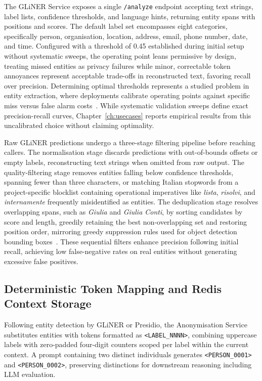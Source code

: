 The GLiNER Service exposes a single \texttt{/analyze} endpoint accepting text strings, label lists, confidence thresholds, and language hints, returning entity spans with positions and scores. The default label set encompasses eight categories, specifically person, organisation, location, address, email, phone number, date, and time. Configured with a threshold of 0.45 established during initial setup without systematic sweeps, the operating point leans permissive by design, treating missed entities as privacy failures while minor, correctable token annoyances represent acceptable trade-offs in reconstructed text, favoring recall over precision. Determining optimal thresholds represents a studied problem in entity extraction, where deployments calibrate operating points against specific miss versus false alarm costs~\cite{minkov2006tradeoff}. While systematic validation sweeps define exact precision-recall curves, Chapter~\ref{ch:usecases} reports empirical results from this uncalibrated choice without claiming optimality.

Raw GLiNER predictions undergo a three-stage filtering pipeline before reaching callers. The normalisation stage discards predictions with out-of-bounds offsets or empty labels, reconstructing text strings when omitted from raw output. The quality-filtering stage removes entities falling below confidence thresholds, spanning fewer than three characters, or matching Italian stopwords from a project-specific blocklist containing operational imperatives like \emph{lista}, \emph{risolvi}, and \emph{internamente} frequently misidentified as entities. The deduplication stage resolves overlapping spans, such as \emph{Giulia} and \emph{Giulia Conti}, by sorting candidates by score and length, greedily retaining the best non-overlapping set and restoring position order, mirroring greedy suppression rules used for object detection bounding boxes~\cite{neubeck2006nms}. These sequential filters enhance precision following initial recall, achieving low false-negative rates on real entities without generating excessive false positives.

\subsection{Deterministic Token Mapping and Redis Context Storage}
\label{subsec:impl_token_reinjection}

Following entity detection by GLiNER or Presidio, the Anonymisation Service substitutes entities with tokens formatted as \texttt{<LABEL\_NNNN>}, combining uppercase labels with zero-padded four-digit counters scoped per label within the current context. A prompt containing two distinct individuals generates \texttt{<PERSON\_0001>} and \texttt{<PERSON\_0002>}, preserving distinctions for downstream reasoning including LLM evaluation.

